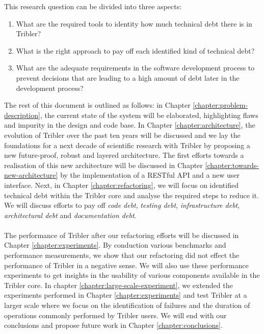 This research question can be divided into three aspects:
\begin{enumerate}
	\item What are the required tools to identity how much technical debt there is in Tribler?
	\item What is the right approach to pay off each identified kind of technical debt?
	\item What are the adequate requirements in the software development process to prevent decisions that are leading to a high amount of debt later in the development process?
\end{enumerate}
The rest of this document is outlined as follows: in Chapter \ref{chapter:problem-description}, the current state of the system will be elaborated, highlighting flaws and impurity in the design and code base. 
In Chapter \ref{chapter:architecture}, the evolution of Tribler over the past ten years will be discussed and we lay the foundations for a next decade of scientific research with Tribler by proposing a new future-proof, robust and layered architecture.
The first efforts towards a realisation of this new architecture will be discussed in Chapter \ref{chapter:towards-new-architecture} by the implementation of a RESTful API and a new user interface.
Next, in Chapter \ref{chapter:refactoring}, we will focus on identified technical debt within the Tribler core and analyse the required steps to reduce it. 
We will discuss efforts to pay off \emph{code debt}, \emph{testing debt}, \emph{infrastructure debt}, \emph{architectural debt} and \emph{documentation debt}.\\\\
The performance of Tribler after our refactoring efforts will be discussed in Chapter \ref{chapter:experiments}.
By conduction various benchmarks and performance measurements, we show that our refactoring did not effect the performance of Tribler in a negative sense.
We will also use these performance experiments to get insights in the usability of various components available in the Tribler core.
In chapter \ref{chapter:large-scale-experiment}, we extended the experiments performed in Chapter \ref{chapter:experiments} and test Tribler at a larger scale where we focus on the identification of failures and the duration of operations commonly performed by Tribler users.
We will end with our conclusions and propose future work in Chapter \ref{chapter:conclusions}.

